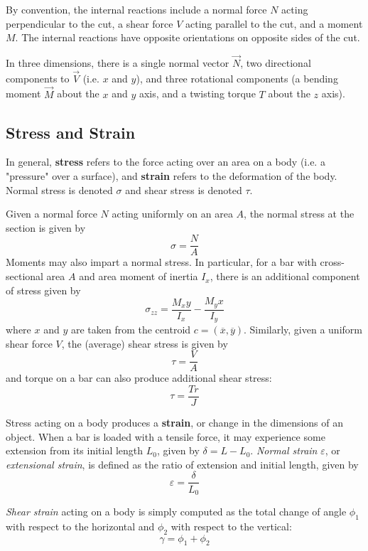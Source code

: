 By convention, the internal reactions include a normal force $N$ acting perpendicular to the cut, a shear force $V$ acting parallel to the cut, and a moment $M$. The internal reactions have opposite orientations on opposite sides of the cut.

In three dimensions, there is a single normal vector $\vec{N}$, two directional components to $\vec{V}$ (i.e. $x$ and $y$), and three rotational components (a bending moment $\vec{M}$ about the $x$ and $y$ axis, and a twisting torque $T$ about the $z$ axis).

\subsection{Stress and Strain}

In general, \textbf{stress} refers to the force acting over an area on a body (i.e. a "pressure" over a surface), and \textbf{strain} refers to the deformation of the body. Normal stress is denoted $\sigma$ and shear stress is denoted $\tau$.

Given a normal force $N$ acting uniformly on an area $A$, the normal stress at the section is given by \[\sigma = \frac{N}{A}\] Moments may also impart a normal stress. In particular, for a bar with cross-sectional area $A$ and area moment of inertia $I_x$, there is an additional component of stress given by \[\sigma_{zz} = \frac{M_xy}{I_x} - \frac{M_yx}{I_y}\] where $x$ and $y$ are taken from the centroid $c=(\overline{x},\overline{y})$. Similarly, given a uniform shear force $V$, the (average) shear stress is given by \[\tau = \frac{V}{A}\] and torque on a bar can also produce additional shear stress: \[\tau = \frac{Tr}{J}\]

\newpage

Stress acting on a body produces a \textbf{strain}, or change in the dimensions of an object. When a bar is loaded with a tensile force, it may experience some extension from its initial length $L_0$, given by $\delta = L-L_0$. \textit{Normal strain} $\varepsilon$, or \textit{extensional strain}, is defined as the ratio of extension and initial length, given by \[\varepsilon = \frac{\delta}{L_0}\]

\textit{Shear strain} acting on a body is simply computed as the total change of angle $\phi_1$ with respect to the horizontal and $\phi_2$ with respect to the vertical: \[\gamma = \phi_1 + \phi_2\]

